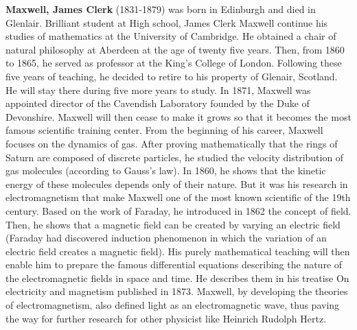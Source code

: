\textbf{Maxwell, James Clerk} (1831-1879) was born in Edinburgh and died in Glenlair. Brilliant student at High school, James Clerk Maxwell continue his studies of mathematics at the University of Cambridge. He obtained a chair of natural philosophy at Aberdeen at the age of twenty five years. Then, from 1860 to 1865, he served as professor at the King's College of London. Following these five years of teaching, he decided to retire to his property of Glenair, Scotland. He will stay there during five more years to study. In 1871, Maxwell was appointed director of the Cavendish Laboratory founded by the Duke of Devonshire. Maxwell will then cease to make it grows so that it becomes the most famous scientific training center. From the beginning of his career, Maxwell focuses on the dynamics of gas. After proving mathematically that the rings of Saturn are composed of discrete particles, he studied the velocity distribution of gas molecules (according to Gauss's law). In 1860, he shows that the kinetic energy of these molecules depends only of their nature. But it was his research in electromagnetism that make Maxwell one of the most known scientific of the 19th century. Based on the work of Faraday, he introduced in 1862 the concept of field. Then, he shows that a magnetic field can be created by varying an electric field (Faraday had discovered induction phenomenon in which the variation of an electric field creates a magnetic field). His purely mathematical teaching will then enable him to prepare the famous differential equations describing the nature of the electromagnetic fields in space and time. He describes them in his treatise On electricity and magnetism published in 1873. Maxwell, by developing the theories of electromagnetism, also defined light as an electromagnetic wave, thus paving the way for further research for other physicist like Heinrich Rudolph Hertz.

